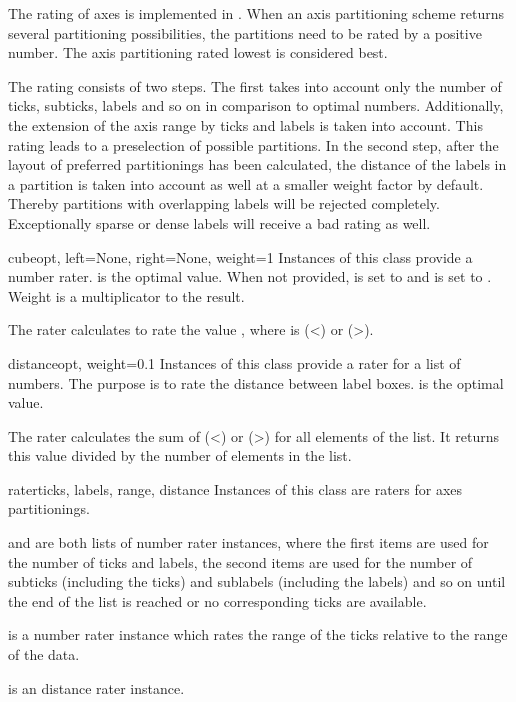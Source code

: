 
The rating of axes is implemented in . When
an axis partitioning scheme returns several partitioning
possibilities, the partitions need to be rated by a positive number.
The axis partitioning rated lowest is considered best.

The rating consists of two steps. The first takes into account only
the number of ticks, subticks, labels and so on in comparison to
optimal numbers. Additionally, the extension of the axis range by
ticks and labels is taken into account. This rating leads to a
preselection of possible partitions. In the second step, after the
layout of preferred partitionings has been calculated, the distance of 
the labels in a partition is taken into account as well at a smaller
weight factor by default. Thereby partitions with overlapping labels
will be rejected completely. Exceptionally sparse or dense labels will
receive a bad rating as well.

\begin{classdesc}{cube}{opt, left=None, right=None, weight=1}
  Instances of this class provide a number rater.  is the
  optimal value. When not provided,  is set to  and
   is set to . Weight is a multiplicator
  to the result.

  The rater calculates
   to rate the
  value , where  is 
  (\textless{}) or 
  (\textgreater{}).
\end{classdesc}

\begin{classdesc}{distance}{opt, weight=0.1}
  Instances of this class provide a rater for a list of numbers.
  The purpose is to rate the distance between label boxes. 
  is the optimal value.

  The rater calculates the sum of 
  (\textless{}) or 
  (\textgreater{}) for all elements  of the
  list. It returns this value divided by the number of elements in the
  list.
\end{classdesc}

\begin{classdesc}{rater}{ticks, labels, range, distance}
  Instances of this class are raters for axes partitionings.

   and  are both lists of number rater
  instances, where the first items are used for the number of ticks
  and labels, the second items are used for the number of subticks
  (including the ticks) and sublabels (including the labels) and so on
  until the end of the list is reached or no corresponding ticks are
  available.

   is a number rater instance which rates the range of the
  ticks relative to the range of the data.

   is an distance rater instance.
\end{classdesc}

